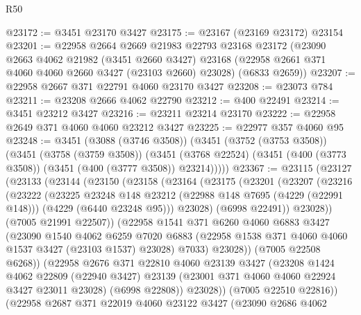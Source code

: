 \begin{lexlean}{R50}
\begin{coremodule}
@23172 := @3451 @23170 @3427
@23175 := @23167 (@23169 @23172) @23154
@23201 := @22958
    @2664
    @2669
    @21983
    @22793
    @23168
    @23172
    (@23090
      @2663
      @4062
      @21982
      (@3451 @2660 @3427)
      @23168
      (@22958 @2661 @371 @4060 @4060 @2660 @3427 (@23103 @2660) @23028)
      (@6833 @2659))
@23207 := @22958 @2667 @371 @22791 @4060 @23170 @3427
@23208 := @23073 @784
@23211 := @23208 @2666 @4062 @22790
@23212 := @400 @22491
@23214 := @3451 @23212 @3427
@23216 := @23211 @23214 @23170
@23222 := @22958 @2649 @371 @4060 @4060 @23212 @3427
@23225 := @22977 @357 @4060 @95
@23248 := @3451
    (@3088 (@3746 @3508))
    (@3451
      (@3752 (@3753 @3508))
      (@3451
        (@3758 (@3759 @3508))
        (@3451 (@3768 @22524) (@3451 (@400 (@3773 @3508)) (@3451 (@400 (@3777 @3508)) @23214)))))
@23367 := @23115
    (@23127
      (@23133
        (@23144
          (@23150
            (@23158
              (@23164
                (@23175
                  (@23201
                    (@23207
                      (@23216
                        (@23222
                          (@23225
                            @23248
                            @148
                            @23212
                            (@22988 @148 @7695 (@4229 (@22991 @148)))
                            (@4229 (@6440 @23248 @95)))
                          @23028)
                        (@6998 @22491))
                      @23028))
                  (@7005 @21991 @22507))
                (@22958
                  @1541
                  @371
                  @6260
                  @4060
                  @6883
                  @3427
                  (@23090
                    @1540
                    @4062
                    @6259
                    @7020
                    @6883
                    (@22958 @1538 @371 @4060 @4060 @1537 @3427 (@23103 @1537) @23028)
                    @7033)
                  @23028))
              (@7005 @22508 @6268))
            (@22958
              @2676
              @371
              @22810
              @4060
              @23139
              @3427
              (@23208
                @1424
                @4062
                @22809
                (@22940 @3427)
                @23139
                (@23001 @371 @4060 @4060 @22924 @3427 @23011 @23028)
                (@6998 @22808))
              @23028))
          (@7005 @22510 @22816))
        (@22958
          @2687
          @371
          @22019
          @4060
          @23122
          @3427
          (@23090
            @2686
            @4062

\end{coremodule}
\end{lexlean}
